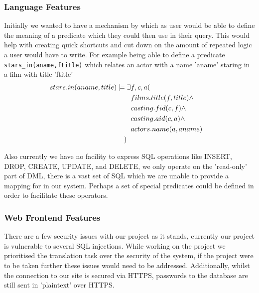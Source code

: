 \documentclass[a4paper, 11pt]{article}
\begin{document}
    \subsubsection{Language Features}
    Initially we wanted to have a mechanism by which as user would be able to
    define the meaning of a predicate which they could then use in their query.
    This would help with creating quick shortcuts and cut down on the amount of 
    repeated logic a user would have to write. For example being able to define a 
    predicate \texttt{stars\_in(aname,ftitle)} which relates an actor with a name 
    'aname' staring in a film with title 'ftitle'
    \begin{align*}
      stars.in(aname, title) \models \exists  & f,c,a (  &                                    \\
                                              & films.title(f,title) \land &                  \\
                                              & casting.fid(c,f) \land &                      \\
                                              & casting.aid(c,a) \land &                      \\
                                              & actors.name(a,aname) &                        \\
    ) \hspace{2mm} & &
    \end{align*}

    Also currently we have no facility to express SQL operations like INSERT, 
    DROP, CREATE, UPDATE, and DELETE, we only operate on the 'read-only' part 
    of DML, there is a vast set of SQL which we are unable to provide a mapping 
    for in our system. Perhaps a set of special predicates could be defined in
    order to facilitate these operators.
    
    \subsubsection{Web Frontend Features}
    There are a few security issues with our project as it stands, currently our 
    project is vulnerable to several SQL injections. While working on the project
    we prioritised the translation task over the security of the system, if the 
    project were to be taken further these issues would need to be addressed. 
    Additionally, whilst the connection to our site is secured via HTTPS, 
    passwords to the database are still sent in 'plaintext' over HTTPS.
    
\end{document}
